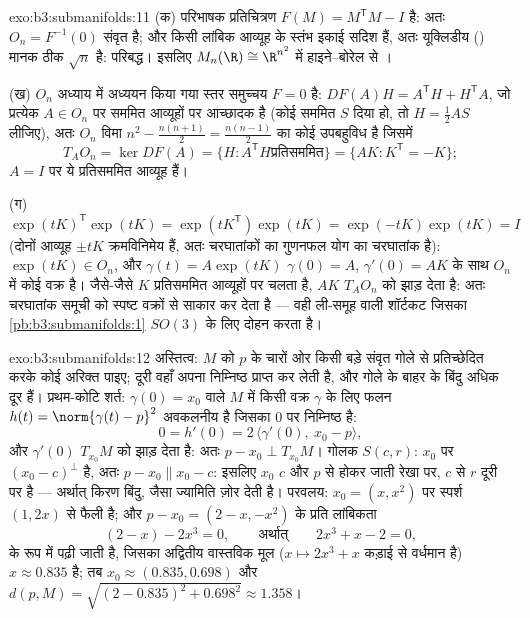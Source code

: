 \begin{solution}{exo:b3:submanifolds:11}
(क) परिभाषक प्रतिचित्रण $F(M) = M^{\mathsf T}M - I$  है: अतः $O_n = F^{-1}(0)$ संवृत है; और किसी
लांबिक आव्यूह के स्तंभ इकाई सदिश हैं, अतः यूक्लिडीय ()
मानक ठीक $\sqrt n$ है: परिबद्ध। इसलिए $M_n(\R) \cong \R^{n^2}$ में हाइने--बोरेल से ।

(ख) $O_n$ अध्याय में अध्ययन किया गया स्तर समुच्चय $F = 0$ है: $DF(A)H = A^{\mathsf T}H + H^{\mathsf T}A$,
जो प्रत्येक $A \in O_n$ पर सममित आव्यूहों पर आच्छादक है (कोई सममित $S$
दिया हो, तो $H = \frac12AS$ लीजिए), अतः $O_n$ विमा $n^2 - \frac{n(n+1)}2 = \frac{n(n-1)}2$ का कोई उपबहुविध है
जिसमें
\[
T_AO_n = \ker DF(A) = \{H : A^{\mathsf T}H \text{
प्रतिसममित}\} = \{AK : K^{\mathsf T} = -K\} ;
\]
$A = I$ पर ये प्रतिसममित आव्यूह हैं।

(ग) $\exp(tK)^{\mathsf T}\exp(tK) = \exp(tK^{\mathsf T})
\exp(tK) = \exp(-tK)\exp(tK) = I$ (दोनों आव्यूह $\pm tK$ क्रमविनिमेय हैं, अतः चरघातांकों का
गुणनफल योग का चरघातांक है): $\exp(tK) \in O_n$, और $\gamma(t) =
A\exp(tK)$ $\gamma(0) = A$, $\gamma'(0) = AK$ के साथ $O_n$
में कोई वक्र है। जैसे-जैसे $K$ प्रतिसममित आव्यूहों पर चलता है,
$AK$ $T_AO_n$ को झाड़ देता है: अतः चरघातांक समूची  को
स्पष्ट वक्रों से साकार कर देता है --- वही ली-समूह वाली शॉर्टकट जिसका
\cref{pb:b3:submanifolds:1} $SO(3)$ के लिए दोहन करता है।
\end{solution}

\begin{solution}{exo:b3:submanifolds:12}
अस्तित्व: $M$ को $p$ के चारों ओर किसी बड़े संवृत गोले से प्रतिच्छेदित
करके कोई अरिक्त  पाइए;  दूरी वहाँ अपना निम्निष्ठ प्राप्त कर
लेती है, और गोले के बाहर के बिंदु अधिक दूर हैं। प्रथम-कोटि शर्त:
$\gamma(0) = x_0$ वाले $M$ में किसी वक्र $\gamma$ के लिए फलन $h(t) = \norm{\gamma(t)
- p}^2$ अवकलनीय है
जिसका $0$ पर निम्निष्ठ है:
\[
0 = h'(0) = 2\,\langle\gamma'(0),\ x_0 - p\rangle,
\]
और $\gamma'(0)$ $T_{x_0}M$ को झाड़ देता है: अतः $p - x_0 \perp
T_{x_0}M$। गोलक $S(c, r)$: $x_0$ पर  $(x_0 - c)^\perp$ है, अतः $p - x_0 \parallel x_0 - c$: इसलिए $x_0$ $c$ और $p$ से होकर जाती
रेखा पर, $c$ से $r$ दूरी पर है --- अर्थात् किरण बिंदु, जैसा
ज्यामिति ज़ोर देती है। परवलय: $x_0 = (x, x^2)$ पर स्पर्श $(1, 2x)$ से फैली है; और
$p - x_0 = (2 - x, -x^2)$ के प्रति लांबिकता
\[
(2 - x) - 2x^3 = 0,
\qquad\text{अर्थात्}\qquad 2x^3 + x - 2 = 0,
\]
के रूप में पढ़ी जाती है, जिसका अद्वितीय वास्तविक मूल ($x \mapsto 2x^3 + x$ कड़ाई
से वर्धमान है) $x \approx 0.835$ है; तब $x_0 \approx (0.835,
0.698)$ और $d(p, M) = \sqrt{(2 - 0.835)^2 + 0.698^2}
\approx 1.358$।
\end{solution}

